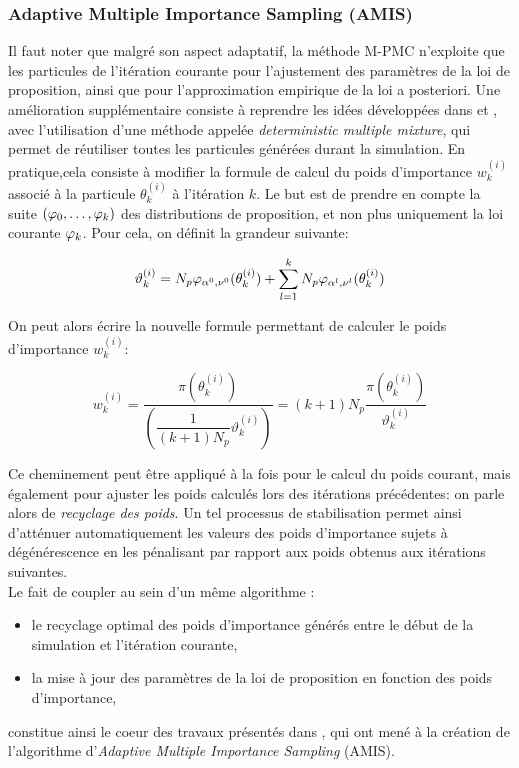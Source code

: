 \subsubsection{Adaptive Multiple Importance Sampling (AMIS)}

{Il faut noter que malgré son aspect adaptatif, la méthode M-PMC n'exploite que les particules de l'itération courante pour l'ajustement des paramètres de la loi de proposition, ainsi que pour l'approximation empirique de la loi a posteriori. Une amélioration supplémentaire consiste à reprendre les idées développées dans } \cite{Veach1995} et \cite{Owen2000}, avec l'utilisation d'une méthode appelée \textit{deterministic multiple mixture}, {qui permet de réutiliser toutes les particules générées durant la simulation}. En pratique,cela consiste à modifier la formule de calcul du poids d'importance $w_k^{(i)}$ associé à la particule $\theta_k^{(i)}$ à l'itération $k$. Le but est de prendre en compte la suite $({\varphi}_0, \dots, {\varphi}_k)$ des distributions de proposition, et non plus uniquement la loi  courante ${\varphi}_k$. Pour cela, on définit la grandeur suivante:

\begin{equation}
	\vartheta_k^{(i)} = N_p {\varphi}_{\alpha^0,\nu^0}(\theta_k^{(i)}) + \sum\limits_{l=1}^k N_p {\varphi}_{\alpha^l,\nu^l}(\theta_k^{(i)})
	\label{eq_DMW_1}
\end{equation}

On peut alors écrire la nouvelle formule permettant de calculer le poids d'importance $w_k^{(i)}$:

\begin{equation}
	w_k^{(i)} = \dfrac{\pi(\theta_k^{(i)})}{\left(\dfrac{1}{(k+1)N_p}\vartheta_k^{(i)}\right)} = (k+1)N_p\dfrac{\pi(\theta_k^{(i)})}{\vartheta_k^{(i)}}
\end{equation}

Ce cheminement peut être appliqué à la fois pour le calcul du poids courant, mais également pour ajuster les poids calculés lors des itérations précédentes: on parle alors de \textit{recyclage des poids}. Un tel processus de stabilisation  permet ainsi d'atténuer automatiquement les valeurs des poids d'importance sujets à dégénérescence en les pénalisant par rapport aux poids obtenus aux itérations suivantes.\\

Le fait de coupler au sein d'un même algorithme : \\

\begin{itemize}
	\item le  recyclage optimal des poids d'importance générés entre le début de la simulation et l'itération courante,
	\item la mise à jour des paramètres de la loi de proposition en fonction des poids d'importance,\\
\end{itemize}
constitue ainsi le coeur des travaux présentés dans \cite{Cornuet2012}, qui ont mené à la création de l'algorithme d'\textit{Adaptive Multiple Importance Sampling} (AMIS). \\

